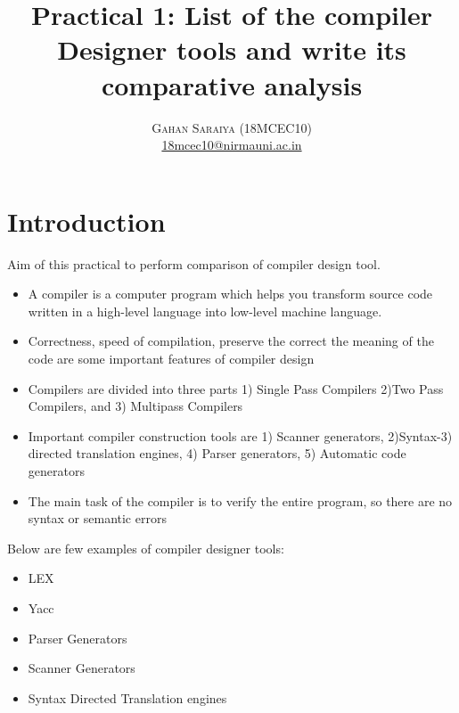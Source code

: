 \documentclass[paper=letter, fontsize=12pt]{article}
\date{}
\title{\vspace{-15mm}\fontsize{24pt}{10pt}\selectfont\textbf{Practical 1: List of the compiler Designer tools and write its comparative analysis}} %
\author{
	\large
	{\textsc{Gahan Saraiya (18MCEC10)}}\\[2mm]
	\normalsize \href{mailto:18mcec10@nirmauni.ac.in}{18mcec10@nirmauni.ac.in}\\[2mm] %
}
\date{}
\begin{document}
\maketitle %
\thispagestyle{fancy} %

\section{Introduction}\label{sec:introduction}
Aim of this practical to perform comparison of compiler design tool.
\begin{itemize}
	\item A compiler is a computer program which helps you transform source code written in a high-level language into low-level machine language.
	\item Correctness, speed of compilation, preserve the correct the meaning of the code are some important features of compiler design
	\item Compilers are divided into three parts 1) Single Pass Compilers 2)Two Pass Compilers, and 3) Multipass Compilers
	\item Important compiler construction tools are 1) Scanner generators, 2)Syntax-3) directed translation engines, 4) Parser generators, 5) Automatic code generators
	\item The main task of the compiler is to verify the entire program, so there are no syntax or semantic errors
\end{itemize}

Below are few examples of compiler designer tools:
\begin{itemize}
	\item LEX
	\item Yacc
	\item Parser Generators
	\item Scanner Generators
	\item Syntax Directed Translation engines
\end{itemize}
\end{document}
